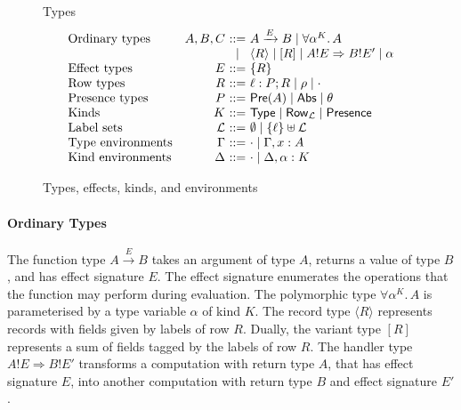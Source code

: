 \documentclass[mscres,icsa,lfcs,twoside,openright,logo,rightchapter,normalheadings]{infthesis}
\makeatletter
\theoremstyle{definition}
\newcommand{\slab}[1]{\textrm{#1}}
\newcommand{\Record}[1]{\ensuremath{\langle #1 \rangle}}
\newcommand{\Pre}[1]{\mathsf{Pre}(#1)}
\newcommand{\Abs}{\mathsf{Abs}}
\newcommand{\Presence}{\mathsf{Presence}}
\newcommand{\Row}{\mathsf{Row}}
\newcommand{\Type}{\mathsf{Type}}
\newcommand{\Int}{\mathsf{Int}}
\newcommand{\Bool}{\mathsf{Bool}}
\newcommand{\Harrow}[4]{#1!#2 \Rightarrow #3!#4}
\newcommand{\ba}{\begin{array}}
\newcommand{\ea}{\end{array}}
\newenvironment{syntax}{\[\ba{@{}l@{\quad}r@{~}c@{~}l@{}}}{\ea\]\ignorespacesafterend}
\makeatother
\begin{document}
\begin{figure}
Types
\begin{syntax}
\slab{Ordinary types} &A,B,C  &::= & %
                                      A \xrightarrow{E} B
                               \mid  \forall \alpha^K .\, A \\
                             &&\mid& \Record{R} \mid [R]
                               \mid  \Harrow{A}{E}{B}{E'} \mid \alpha \\
\slab{Effect types}   &E    &::= & \{R\}\\
\slab{Row types}      &R    &::= & \ell : P;R \mid \rho \mid \cdot \\
\slab{Presence types} &P    &::= & \Pre{A} \mid \Abs \mid \theta\\
\slab{Kinds}          &K    &::= & \Type \mid \Row_\mathcal{L} \mid \Presence\\
\slab{Label sets}     &\mathcal{L} &::=& \emptyset \mid \{\ell\} \uplus \mathcal{L}\\
\slab{Type environments} &\Gamma &::=& \cdot \mid \Gamma, x:A \\
\slab{Kind environments} &\Delta &::=& \cdot \mid \Delta, \alpha:K \\
\end{syntax}
\caption{Types, effects, kinds, and environments}
\label{fig:types-syntax}
\end{figure}

\paragraph{Ordinary Types}
The function type $A \xrightarrow{E} B$ takes an argument of type $A$,
returns a value of type $B$, and has effect signature $E$. The effect
signature enumerates the operations that the function may perform
during evaluation. The polymorphic type $\forall \alpha^K .\, A$ is
parameterised by a type variable $\alpha$ of kind $K$. The record type
$\Record{R}$ represents records with fields given by labels of row
$R$. Dually, the variant type $[R]$ represents a sum of fields tagged
by the labels of row $R$. The handler type $\Harrow{A}{E}{B}{E'}$
transforms a computation with return type $A$, that has effect
signature $E$, into another computation with return type $B$ and
effect signature $E'$.
\end{document}
